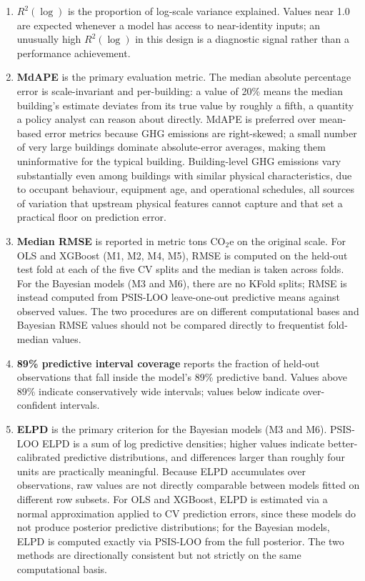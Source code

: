 \begin{enumerate}
  \item \textbf{$R^2(\log)$} is the proportion of log-scale variance explained. Values near 1.0 are expected whenever a model has access to near-identity inputs; an unusually high $R^2(\log)$ in this design is a diagnostic signal rather than a performance achievement.
  \item \textbf{MdAPE} is the primary evaluation metric. The median absolute percentage error is scale-invariant and per-building: a value of 20\% means the median building's estimate deviates from its true value by roughly a fifth, a quantity a policy analyst can reason about directly. MdAPE is preferred over mean-based error metrics because GHG emissions are right-skewed; a small number of very large buildings dominate absolute-error averages, making them uninformative for the typical building. Building-level GHG emissions vary substantially even among buildings with similar physical characteristics, due to occupant behaviour, equipment age, and operational schedules, all sources of variation that upstream physical features cannot capture and that set a practical floor on prediction error.
  \item \textbf{Median RMSE} is reported in metric tons CO$_2$e on the original scale. For OLS and XGBoost (M1, M2, M4, M5), RMSE is computed on the held-out test fold at each of the five CV splits and the median is taken across folds. For the Bayesian models (M3 and M6), there are no KFold splits; RMSE is instead computed from PSIS-LOO leave-one-out predictive means against observed values. The two procedures are on different computational bases and Bayesian RMSE values should not be compared directly to frequentist fold-median values.
  \item \textbf{89\% predictive interval coverage} reports the fraction of held-out observations that fall inside the model's 89\% predictive band. Values above 89\% indicate conservatively wide intervals; values below indicate over-confident intervals.
  \item \textbf{ELPD} is the primary criterion for the Bayesian models (M3 and M6). PSIS-LOO ELPD is a sum of log predictive densities; higher values indicate better-calibrated predictive distributions, and differences larger than roughly four units are practically meaningful. Because ELPD accumulates over observations, raw values are not directly comparable between models fitted on different row subsets. For OLS and XGBoost, ELPD is estimated via a normal approximation applied to CV prediction errors, since these models do not produce posterior predictive distributions; for the Bayesian models, ELPD is computed exactly via PSIS-LOO from the full posterior. The two methods are directionally consistent but not strictly on the same computational basis.
\end{enumerate}

